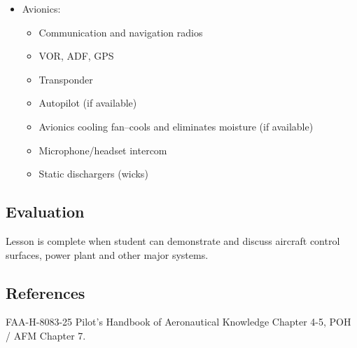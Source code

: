 \begin{itemize}
  \item Avionics:
    \begin{itemize}
      \item Communication and navigation radios

      \item VOR, ADF, GPS

      \item Transponder

      \item Autopilot (if available)

      \item Avionics cooling fan--cools and eliminates moisture (if available)

      \item Microphone/headset intercom

      \item Static dischargers (wicks)
    \end{itemize}
\end{itemize}

\subsection{Evaluation}

Lesson is complete when student can demonstrate and discuss aircraft control
surfaces, power plant and other major systems.

\subsection{References}

FAA-H-8083-25 Pilot's Handbook of Aeronautical Knowledge Chapter 4-5, POH / AFM
Chapter 7.

